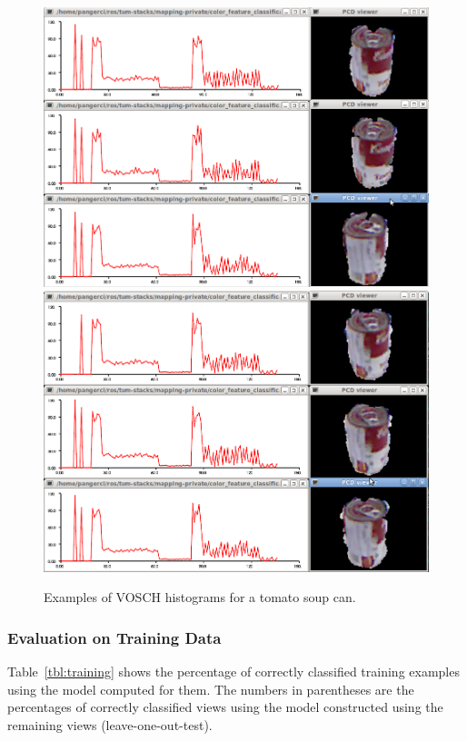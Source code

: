 \documentclass[conference]{sty/IEEEtran}
\begin{document}
\begin{figure}[htb!]
  \begin{center}
    \includegraphics[width=.9\columnwidth]{figures/colorCHLAC/real/tomato/tomato_hist_pcd.png}
    \includegraphics[width=.9\columnwidth]{figures/colorCHLAC/real/tomato/tomato_hist_pcd2.png}
    \caption{Examples of  VOSCH histograms for a tomato soup can.}
    \label{fig:grsd_colorchlac_tomato}
  \end{center}
\end{figure}


\subsubsection{Evaluation on Training Data}
Table~\ref{tbl:training} shows the percentage of correctly classified training examples using the model computed for them.
The numbers in parentheses are the percentages of correctly classified views using the model constructed using the remaining views
(leave-one-out-test).
\end{document}
